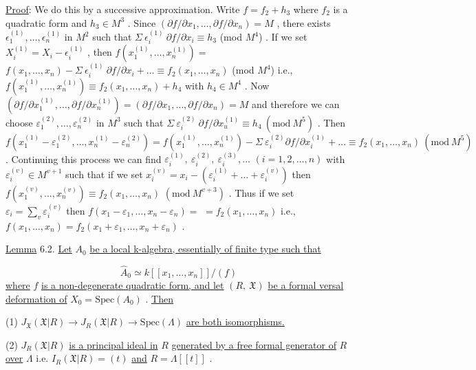 \underline{Proof}:  We do this by a successive approximation. Write  $f = f_2 + h_3$  where  $f_2$ is a quadratic form and  $h_3 \in M^3$  . Since  $(\partial f/\partial x_1,\ldots,\partial f/\partial x_n) = M$  , there exists $\epsilon_1^{(1)},\ldots,\epsilon_n^{(1)}$  in  $M^2$  such that  $\Sigma\ \epsilon_i^{(1)}\ \partial f/\partial x_i \equiv h_3$  (mod $M^4$)  . If we set $X_i^{(1)} = X_i - \epsilon_i^{(1)}$  , then  $f(x_1^{(1)},\ldots,x_n^{(1)}) =$ $f(x_1,\ldots,x_n) - \Sigma\ \epsilon_i^{(1)}\ \partial f/\partial x_i + \ldots \equiv f_2(x_1,\ldots,x_n)$  (mod $M^4$)  i.e., $f(x_1^{(1)},\ldots,x_n^{(1)}) \equiv f_2(x_1,\ldots,x_n) + h_4$  with  $h_4 \in M^4$  . Now $(\partial f/\partial x_1^{(1)},\ldots,\partial f/\partial x_n^{(1)}) = (\partial f/\partial x_1,\ldots,\partial f/\partial x_n) = M$  and therefore we can choose
$\varepsilon_1^{(2)},\dots,\varepsilon_n^{(2)}$  in  $M^3$  such that  $\Sigma\ \varepsilon_i^{(2)}\ \partial f/\partial x_u^{(1)} \equiv h_4\ (\mathrm{mod}\ M^5)$ . Then $f(x_1^{(1)} - \varepsilon_1^{(2)},\dots,x_n^{(1)} - \varepsilon_n^{(2)}) = f(x_1^{(1)},\dots,x_n^{(1)}) - \Sigma\ \varepsilon_i^{(2)}\partial f/\partial x_i^{(1)} + \dots \equiv f_2(x_1,\dots,x_n)\ (\mathrm{mod}\ M^5)$ . Continuing this process we can find $\varepsilon_i^{(1)},\ \varepsilon_i^{(2)},\ \varepsilon_i^{(3)},\dots$  $(i = 1,2,\dots,n)$  with  $\varepsilon_i^{(v)} \in M^{v+1}$  such that if we set $x_i^{(v)} = x_i - (\varepsilon_i^{(1)} + \dots + \varepsilon_i^{(v)})$  then  $f(x_1^{(v)},\dots,x_n^{(v)}) \equiv f_2(x_1,\dots,x_n)$ $(\mathrm{mod}\ M^{v+3})$ . Thus if we set  $\varepsilon_i = \sum_{v} \varepsilon_i^{(v)}$  then  $f(x_1-\varepsilon_1,\dots,x_n-\varepsilon_n) =$ $= f_2(x_1,\dots,x_n)$  i.e.,  $f(x_1,\dots,x_n) = f_2(x_1+\varepsilon_1,\dots,x_n+\varepsilon_n)$ .

\underline{Lemma} 6.2.   \underline{Let}  $A_0$  \underline{be a local k-algebra, essentially of finite type such that}

\begin{equation*}
\hat{A}_0 \simeq k[[x_1,\dots,x_n]]/(f)
\end{equation*}
\underline{where}  $f$  \underline{is a non-degenerate quadratic form, and let}  $(R,\ \mathfrak{X})$  \underline{be a formal versal deformation of}  $X_0 = \mathrm{Spec}(A_0)$  . \underline{Then}

(1)  $J_{\mathfrak{X}}(\mathfrak{X}|R) \rightarrow J_R(\mathfrak{X}|R) \rightarrow \mathrm{Spec}(\Lambda)$  \underline{are both isomorphisms.}

(2)  $J_R(\mathfrak{X}|R)$  \underline{is a principal ideal in}  $R$  \underline{generated by a free formal generator of}  $R$  \underline{over}  $\Lambda$  i.e.  $I_R(\mathfrak{X}|R) = (t)$  \underline{and}  $R = \Lambda[[t]]$  .

